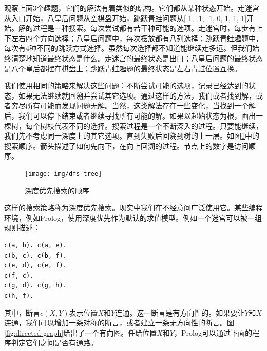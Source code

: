 \documentclass[b5paper]{ctexart}
\begin{document}
观察上面3个趣题，它们的解法有着类似的结构。它们都从某种状态开始。走迷宫从入口开始，八皇后问题从空棋盘开始，跳跃青蛙问题从[-1, -1, -1, 0, 1, 1, 1]开始。解的过程是一种搜索。每次尝试都有若干种可能的选项。走迷宫时，每步有上下左右四个方向选择；八皇后问题中，每次摆放都有八列选择；跳跃青蛙趣题中，每次有4种不同的跳跃方式选择。虽然每次选择都不知道能继续走多远。但我们始终清楚地知道最终状态是什么。走迷宫的最终状态是出口；八皇后问题的最终状态是八个皇后都摆在棋盘上；跳跃青蛙趣题的最终状态是左右青蛙位置互换。

我们使用相同的策略来解决这些问题：不断尝试可能的选项，记录已经达到的状态，如果无法继续就回溯并尝试其它选项。通过这样的方法，我们或者找到解，或者穷尽所有可能而发现问题无解。当然，这类解法存在一些变化，当找到一个解后，我们可以停下结束或者继续寻找所有可能的解。如果以起始状态为根，画出一棵树，每个树枝代表不同的选择。搜索过程是一个不断深入的过程。只要能继续，我们先不考虑同一深度上的其它选项。直到失败后回溯到树的上一层。如图\ref{fig:dfs-tree}中的搜索顺序。箭头描述了如何先向下，在向上回溯的过程。节点上的数字是访问顺序。

\begin{figure}[htbp]
 \centering
 \texttt{[image: img/dfs-tree]}
 \caption{深度优先搜索的顺序}
 \label{fig:dfs-tree}
\end{figure}

这样的搜索策略称为深度优先搜索。现实中我们在不经意间广泛使用它。某些编程环境，例如Prolog，使用深度优先作为默认的求值模型。例如一个迷宫可以被一组规则描述：

\lstset{language=Prolog}
\begin{lstlisting}
c(a, b). c(a, e).
c(b, c). c(b, f).
c(e, d), c(e, f).
c(f, c).
c(g, d). c(g, h).
c(h, f).
\end{lstlisting}

其中，断言$c(X, Y)$表示位置$X$和$Y$连通。这一断言是有方向性的。如果要让$Y$和$X$连通，我们可以增加一条对称的断言，或者建立一条无方向性的断言。图\ref{fig:directed-graph}给出了一个有向图。任给位置$X$和$Y$，Prolog可以通过下面的程序判定它们之间是否有通路。
\end{document}
